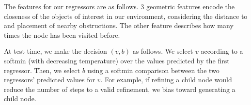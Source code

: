 The features for our regressors are as follows. 3 geometric features encode the closeness of the objects
of interest in our environment, considering the distance to and placement of nearby obstructions. The other
feature describes how many times the node has been visited before.

At test time, we make the decision $(v, b)$ as follows. We select $v$ according to a softmin (with decreasing temperature) over the values
predicted by the first regressor. Then, we select $b$ using a softmin comparison between the two regressors'
predicted values for $v$. For example, if refining a child node would reduce the number of steps to a valid refinement,
we bias toward generating a child node.